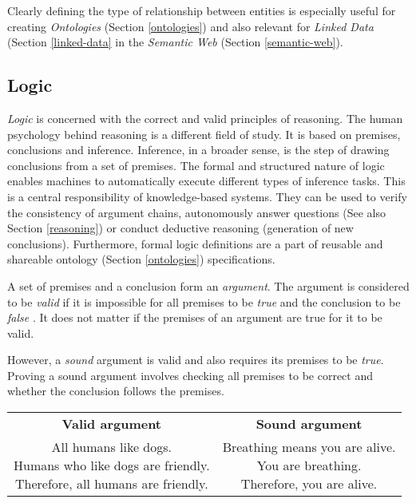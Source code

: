 Clearly defining the type of relationship between entities is especially useful for creating \textit{Ontologies} (Section \ref{ontologies}) and also relevant for \textit{Linked Data} (Section \ref{linked-data} in the \textit{Semantic Web} (Section \ref{semantic-web}).

\subsection{Logic} \label{logic}
\textit{Logic} is concerned with the correct and valid principles of reasoning.
The human psychology behind reasoning is a different field of study.
It is based on premises, conclusions and inference.
Inference, in a broader sense, is the step of drawing conclusions from a set of premises.
The formal and structured nature of logic enables machines to automatically execute different types of inference tasks.
This is a central responsibility of knowledge-based systems.
They can be used to verify the consistency of argument chains, autonomously answer questions (See also Section \ref{reasoning}) or conduct deductive reasoning (generation of new conclusions).
Furthermore, formal logic definitions are a part of reusable and shareable ontology (Section \ref{ontologies}) specifications.

A set of premises and a conclusion form an \textit{argument}.
The argument is considered to be \textit{valid} if it is impossible for all premises to be \textit{true} and the conclusion to be \textit{false} \cite{HarryJ.Gensler1954b}.
It does not matter if the premises of an argument are true for it to be valid.

However, a \textit{sound} argument is valid and also requires its premises to be \textit{true}.
Proving a sound argument involves checking all premises to be correct and whether the conclusion follows the premises. \\

\begin{tabular}{c c}
\textbf{Valid argument} & \textbf{Sound argument} \\
\shortstack[l]{
All humans like dogs. \\
Humans who like dogs are friendly. \\
Therefore, all humans are friendly.
}
&
\shortstack[l]{
Breathing means you are alive. \\
You are breathing. \\
Therefore, you are alive.
}
\end{tabular} \\


